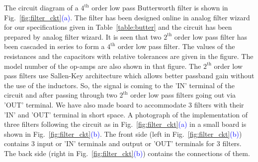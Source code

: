 \FloatBarrier
The circuit diagram of a  $\mathrm{4^{th}}$ order low pass Butterworth filter is shown in Fig.~\ref{fig:filter_ckt}\textcolor{blue}{(a)}. The filter has been designed online in analog filter wizard \cite{fWizard} for our specifications given in Table~\ref{table:butter} and the circuit has been prepared by analog filter wizard. It is seen that two $\mathrm{2^{th}}$ order low pass filter has been cascaded in series to form a $\mathrm{4^{th}}$ order low pass filter. The values of the resistances and the capacitors with relative tolerances are given in the figure. The model number of the op-amps are also shown in that figure. The $\mathrm{2^{th}}$ order low pass filters use Sallen-Key architecture which allows better passband gain without the use of the inductors. So, the signal is coming to the 'IN' terminal of the circuit and after passing through two $\mathrm{2^{th}}$ order low pass filters going out via 'OUT' terminal. We have also made board to accommodate 3 filters with their 'IN' and 'OUT' terminal in short space. A photograph of the implementation of three filters following the circuit as in Fig.~\ref{fig:filter_ckt}\textcolor{blue}{(a)} in a small board is shown in Fig.~\ref{fig:filter_ckt}\textcolor{blue}{(b)}. The front side (left in Fig.~\ref{fig:filter_ckt}\textcolor{blue}{(b)}) contains 3 input or 'IN' terminals and output or 'OUT' terminals for 3 filters. The back side (right in Fig.~\ref{fig:filter_ckt}\textcolor{blue}{(b)}) contains the connections of them.




